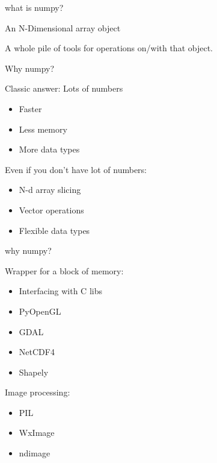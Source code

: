 \documentclass{beamer}
\begin{document}
\begin{frame}[fragile]{what is numpy?}

{\Large An N-Dimensional array object}

\vfill
{\Large A whole pile of tools for operations on/with that object.}

\vfill

\end{frame} 

\begin{frame}[fragile]{Why numpy?}

{\Large Classic answer: Lots of numbers}

\vfill
\begin{itemize}
  \item Faster
  \item Less memory
  \item More data types
\end{itemize}


\vfill
{\Large Even if you don't have lot of numbers:}
\begin{itemize}
  \item N-d array slicing
  \item Vector operations
  \item Flexible data types
\end{itemize}

\end{frame} 

\begin{frame}[fragile]{why numpy?}

{\Large Wrapper for a block of memory:}

\begin{itemize}
  \item Interfacing with C libs
  \item PyOpenGL
  \item GDAL
  \item NetCDF4
  \item Shapely
\end{itemize}

{\Large Image processing:}
\begin{itemize}
  \item PIL
  \item WxImage
  \item ndimage
\end{itemize}

\end{frame} 
\end{document}
